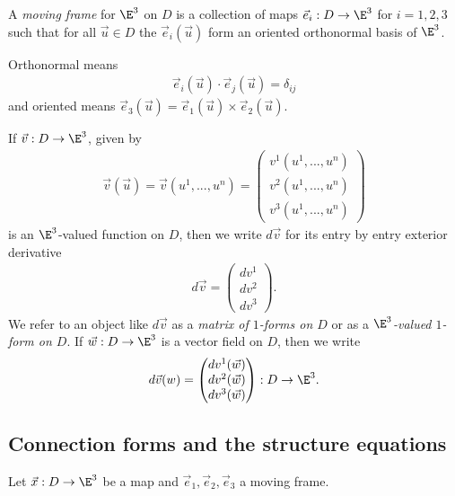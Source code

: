 \documentclass{article}
\begin{document}
\begin{definition}
	A \emph{moving frame} for $\E^3$ on $D$ is a collection of maps $\vec e_i:D\to\E^3$
	for $i=1,2,3$ such that for all $\vec u\in D$ the $\vec e_i(\vec u)$ form an oriented orthonormal
	basis of $\E^3$.

	Orthonormal means
	\begin{align*}
		\vec e_i(\vec u) \cdot \vec e_j(\vec u) = \delta_{ij}
	\end{align*}
	and oriented means $\vec e_3(\vec u) = \vec e_1(\vec u) \times \vec e_2(\vec u)$.
\end{definition}

\begin{definition}
	If $\vec v:D\to\E^3$, given by
	\begin{align*}
		\vec v(\vec u)=\vec v(u^1,...,u^n)=\begin{pmatrix}
			v^1(u^1,...,u^n) \\
			v^2(u^1,...,u^n) \\
			v^3(u^1,...,u^n)
		\end{pmatrix}
	\end{align*}
	is an $\E^3$-valued function on $D$, then we write $d\vec v$ for its entry
	by entry exterior derivative
	\begin{align*}
		d\vec v = \begin{pmatrix}
			dv^1 \\ dv^2 \\ dv^3
		\end{pmatrix}.
	\end{align*}
	We refer to an object like $d\vec v$ as a \emph{matrix of $1$-forms on $D$} or as a
	\emph{$\E^3$-valued $1$-form on $D$}. If $\vec w:D\to\E^3$ is a vector field on $D$, then we write
	\begin{align*}
		d\vec v(w) = \begin{pmatrix}
			dv^1(\vec w) \\ dv^2(\vec w) \\ dv^3(\vec w)
		\end{pmatrix} : D\to\E^3.
	\end{align*}
\end{definition}

\subsection{Connection forms and the structure equations}

Let $\vec x : D \to \E^3$ be a map and $\vec e_1,\vec e_2,\vec e_3$ a moving frame.
\end{document}
